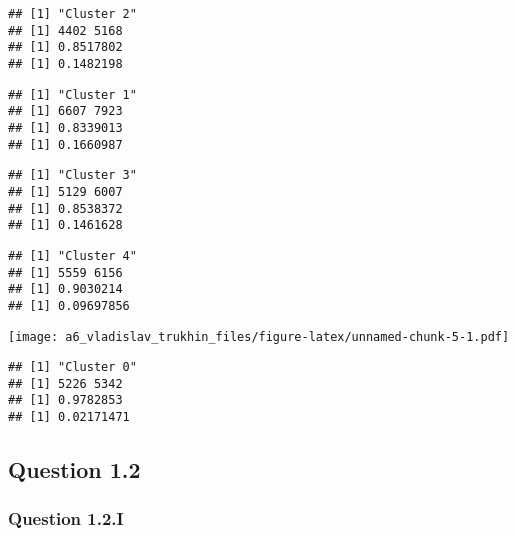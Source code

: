 \documentclass[
]{article}
\newenvironment{Shaded}{\begin{snugshade}}{\end{snugshade}}
\newcommand{\CommentTok}[1]{\textcolor[rgb]{0.56,0.35,0.01}{\textit{#1}}}
\newcommand{\DecValTok}[1]{\textcolor[rgb]{0.00,0.00,0.81}{#1}}
\newcommand{\FunctionTok}[1]{\textcolor[rgb]{0.00,0.00,0.00}{#1}}
\newcommand{\NormalTok}[1]{#1}
\newcommand{\SpecialCharTok}[1]{\textcolor[rgb]{0.00,0.00,0.00}{#1}}
\newcommand{\StringTok}[1]{\textcolor[rgb]{0.31,0.60,0.02}{#1}}
\begin{document}
\begin{Shaded}
\end{Shaded}

\begin{verbatim}
## [1] "Cluster 2"
## [1] 4402 5168
## [1] 0.8517802
## [1] 0.1482198
\end{verbatim}

\begin{verbatim}
## [1] "Cluster 1"
## [1] 6607 7923
## [1] 0.8339013
## [1] 0.1660987
\end{verbatim}

\begin{verbatim}
## [1] "Cluster 3"
## [1] 5129 6007
## [1] 0.8538372
## [1] 0.1461628
\end{verbatim}

\begin{verbatim}
## [1] "Cluster 4"
## [1] 5559 6156
## [1] 0.9030214
## [1] 0.09697856
\end{verbatim}

\texttt{[image: a6\_vladislav\_trukhin\_files/figure-latex/unnamed-chunk-5-1.pdf]}

\begin{verbatim}
## [1] "Cluster 0"
## [1] 5226 5342
## [1] 0.9782853
## [1] 0.02171471
\end{verbatim}

\hypertarget{question-1.2}{%
\subsection{Question 1.2}\label{question-1.2}}

\hypertarget{question-1.2.i}{%
\subsubsection{Question 1.2.I}\label{question-1.2.i}}
\end{document}
